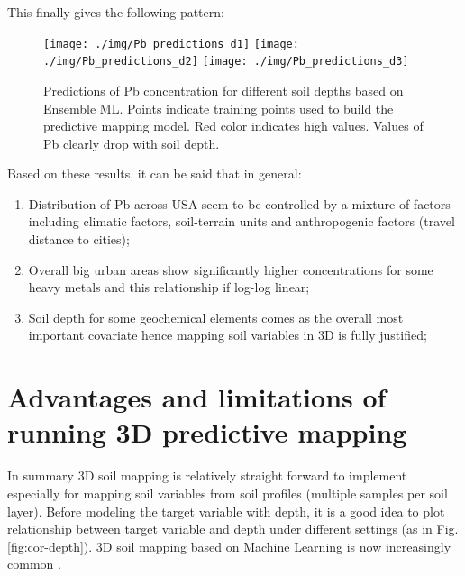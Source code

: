 \documentclass[
  graybox,natbib,nospthms]{svmono}
\providecommand{\tightlist}{%
  \setlength{\itemsep}{0pt}\setlength{\parskip}{0pt}}
\providecommand{\tightlist}{\setlength{\itemsep}{0pt}\setlength{\parskip}{0pt}}
\begin{document}
This finally gives the following pattern:

\begin{figure}

{\centering \texttt{[image: ./img/Pb\_predictions\_d1]} \texttt{[image: ./img/Pb\_predictions\_d2]} \texttt{[image: ./img/Pb\_predictions\_d3]} 

}

\caption{Predictions of Pb concentration for different soil depths based on Ensemble ML. Points indicate training points used to build the predictive mapping model. Red color indicates high values. Values of Pb clearly drop with soil depth.}\label{fig:pred-pb1}
\end{figure}

Based on these results, it can be said that in general:

\begin{enumerate}
\def\labelenumi{\arabic{enumi}.}
\tightlist
\item
  Distribution of Pb across USA seem to be controlled by a mixture of factors
  including climatic factors, soil-terrain units and anthropogenic factors (travel distance to cities);\\
\item
  Overall big urban areas show significantly higher concentrations for some heavy
  metals and this relationship if log-log linear;\\
\item
  Soil depth for some geochemical elements comes as the overall most important
  covariate hence mapping soil variables in 3D is fully justified;
\end{enumerate}

\hypertarget{advantages-and-limitations-of-running-3d-predictive-mapping}{%
\section{Advantages and limitations of running 3D predictive mapping}\label{advantages-and-limitations-of-running-3d-predictive-mapping}}

In summary 3D soil mapping is relatively straight forward to implement especially
for mapping soil variables from soil profiles (multiple samples per soil layer).
Before modeling the target variable with depth, it is a good idea to plot
relationship between target variable and depth under different settings
(as in Fig. \ref{fig:cor-depth}). 3D soil mapping based on Machine Learning is
now increasingly common \citep{hengl2019predictive, sothe2022large}.
\end{document}
